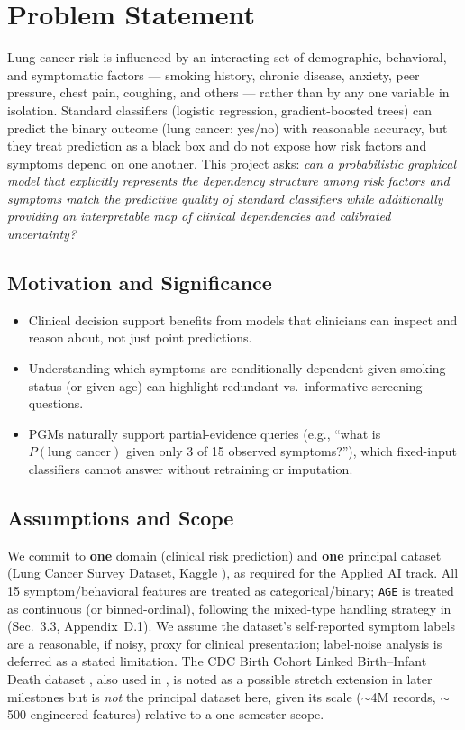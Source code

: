 \documentclass[conference]{IEEEtran}
\begin{document}
	\section{Problem Statement}
	Lung cancer risk is influenced by an interacting set of demographic, behavioral, and symptomatic factors --- smoking history, chronic disease, anxiety, peer pressure, chest pain, coughing, and others --- rather than by any one variable in isolation. Standard classifiers (logistic regression, gradient-boosted trees) can predict the binary outcome (lung cancer: yes/no) with reasonable accuracy, but they treat prediction as a black box and do not expose how risk factors and symptoms depend on one another. This project asks: \emph{can a probabilistic graphical model that explicitly represents the dependency structure among risk factors and symptoms match the predictive quality of standard classifiers while additionally providing an interpretable map of clinical dependencies and calibrated uncertainty?}
	
	\subsection{Motivation and Significance}
	\begin{itemize}
		\item Clinical decision support benefits from models that clinicians can inspect and reason about, not just point predictions.
		\item Understanding which symptoms are conditionally dependent given smoking status (or given age) can highlight redundant vs.\ informative screening questions.
		\item PGMs naturally support partial-evidence queries (e.g., ``what is $P(\text{lung cancer})$ given only 3 of 15 observed symptoms?''), which fixed-input classifiers cannot answer without retraining or imputation.
	\end{itemize}
	
	\subsection{Assumptions and Scope}
	We commit to \textbf{one} domain (clinical risk prediction) and \textbf{one} principal dataset (Lung Cancer Survey Dataset, Kaggle \cite{kaggle_lung}), as required for the Applied AI track. All 15 symptom/behavioral features are treated as categorical/binary; \texttt{AGE} is treated as continuous (or binned-ordinal), following the mixed-type handling strategy in \cite{ngm2022} (Sec.~3.3, Appendix~D.1). We assume the dataset's self-reported symptom labels are a reasonable, if noisy, proxy for clinical presentation; label-noise analysis is deferred as a stated limitation. The CDC Birth Cohort Linked Birth--Infant Death dataset \cite{cdc_data}, also used in \cite{ngm2022}, is noted as a possible stretch extension in later milestones but is \emph{not} the principal dataset here, given its scale ($\sim$4M records, $\sim$500 engineered features) relative to a one-semester scope.
	
\end{document}
